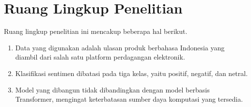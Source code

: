 
\chapter{Ruang Lingkup Penelitian}

Ruang lingkup penelitian ini mencakup beberapa hal berikut.
\begin{enumerate}
  \item Data yang digunakan adalah ulasan produk berbahasa Indonesia
        yang diambil dari salah satu platform perdagangan elektronik.
  \item Klasifikasi sentimen dibatasi pada tiga kelas, yaitu positif,
        negatif, dan netral.
  \item Model yang dibangun tidak dibandingkan dengan model berbasis
        Transformer, mengingat keterbatasan sumber daya komputasi
        yang tersedia.
\end{enumerate}

